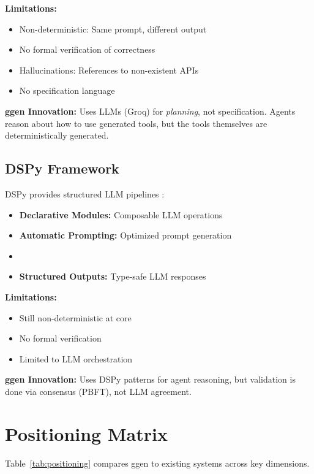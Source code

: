\textbf{Limitations:}
\begin{itemize}
    \item Non-deterministic: Same prompt, different output
    \item No formal verification of correctness
    \item Hallucinations: References to non-existent APIs
    \item No specification language
\end{itemize}

\textbf{ggen Innovation:} Uses LLMs (Groq) for \textit{planning}, not specification. Agents reason about how to use generated tools, but the tools themselves are deterministically generated.

\subsection{DSPy Framework}

DSPy provides structured LLM pipelines \cite{dspy2023}:

\begin{itemize}
    \item \textbf{Declarative Modules:} Composable LLM operations
    \item \textbf{Automatic Prompting:} Optimized prompt generation
    \item \item \textbf{Structured Outputs:} Type-safe LLM responses
\end{itemize}

\textbf{Limitations:}
\begin{itemize}
    \item Still non-deterministic at core
    \item No formal verification
    \item Limited to LLM orchestration
\end{itemize}

\textbf{ggen Innovation:} Uses DSPy patterns for agent reasoning, but validation is done via consensus (PBFT), not LLM agreement.

\section{Positioning Matrix}

Table~\ref{tab:positioning} compares ggen to existing systems across key dimensions.

